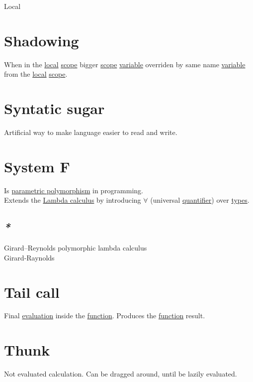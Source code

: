 \documentclass[a4paper,14pt,oneside]{book}
\begin{document}
{\label{org26c2e3f}Local\\

\section{\label{org50fc246}Shadowing}
\label{sec:org37a83cd}
When in the \hyperref[org26c2e3f]{local} \hyperref[orgd4e671a]{scope} bigger \hyperref[orgd4e671a]{scope} \hyperref[org82b2aef]{variable} overriden by same name \hyperref[org82b2aef]{variable} from the \hyperref[org26c2e3f]{local} \hyperref[orgd4e671a]{scope}.\\

\section{\label{org167875f}Syntatic sugar}
\label{sec:org82fad35}
Artificial way to make language easier to read and write.\\

\section{\label{org87616e6}System F}
\label{sec:org90f5e82}
Is \hyperref[orgb7ee91c]{parametric polymorphism} in programming.\\

Extends the \hyperref[org2da0cba]{Lambda calculus} by introducing \(\forall\) (universal \hyperref[org965fc88]{quantifier}) over \hyperref[org51532d9]{types}.\\

\subsection{\emph{*}}
\label{sec:orga658b02}

\label{org4daa937}Girard–Reynolds polymorphic lambda calculus\\
\label{orgf3b1ba4}Girard-Raynolds\\

\section{\label{orga92a09e}Tail call}
\label{sec:org120d931}
Final \hyperref[orga750944]{evaluation} inside the \hyperref[org6a60524]{function}. Produces the \hyperref[org6a60524]{function} result.\\

\section{\label{org34a1b34}Thunk}
\label{sec:org3362b96}
Not evaluated calculation. Can be dragged around, until be lazily evaluated.\\

}
\end{document}

